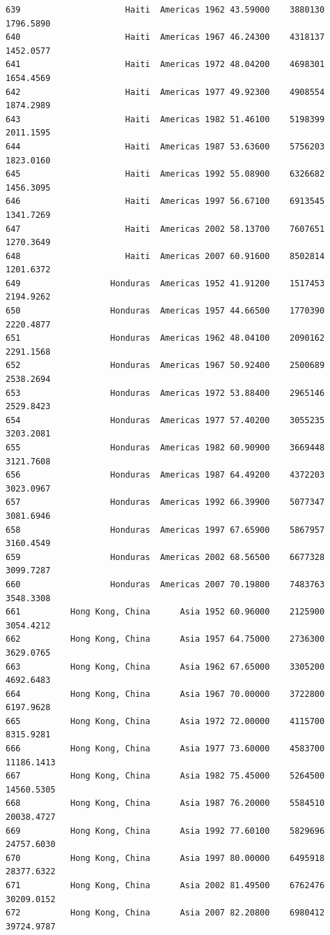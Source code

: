 \documentclass[
  letterpaper,
  DIV=11,
  numbers=noendperiod]{scrreprt}
\begin{document}
\begin{verbatim}
639                     Haiti  Americas 1962 43.59000    3880130   1796.5890
640                     Haiti  Americas 1967 46.24300    4318137   1452.0577
641                     Haiti  Americas 1972 48.04200    4698301   1654.4569
642                     Haiti  Americas 1977 49.92300    4908554   1874.2989
643                     Haiti  Americas 1982 51.46100    5198399   2011.1595
644                     Haiti  Americas 1987 53.63600    5756203   1823.0160
645                     Haiti  Americas 1992 55.08900    6326682   1456.3095
646                     Haiti  Americas 1997 56.67100    6913545   1341.7269
647                     Haiti  Americas 2002 58.13700    7607651   1270.3649
648                     Haiti  Americas 2007 60.91600    8502814   1201.6372
649                  Honduras  Americas 1952 41.91200    1517453   2194.9262
650                  Honduras  Americas 1957 44.66500    1770390   2220.4877
651                  Honduras  Americas 1962 48.04100    2090162   2291.1568
652                  Honduras  Americas 1967 50.92400    2500689   2538.2694
653                  Honduras  Americas 1972 53.88400    2965146   2529.8423
654                  Honduras  Americas 1977 57.40200    3055235   3203.2081
655                  Honduras  Americas 1982 60.90900    3669448   3121.7608
656                  Honduras  Americas 1987 64.49200    4372203   3023.0967
657                  Honduras  Americas 1992 66.39900    5077347   3081.6946
658                  Honduras  Americas 1997 67.65900    5867957   3160.4549
659                  Honduras  Americas 2002 68.56500    6677328   3099.7287
660                  Honduras  Americas 2007 70.19800    7483763   3548.3308
661          Hong Kong, China      Asia 1952 60.96000    2125900   3054.4212
662          Hong Kong, China      Asia 1957 64.75000    2736300   3629.0765
663          Hong Kong, China      Asia 1962 67.65000    3305200   4692.6483
664          Hong Kong, China      Asia 1967 70.00000    3722800   6197.9628
665          Hong Kong, China      Asia 1972 72.00000    4115700   8315.9281
666          Hong Kong, China      Asia 1977 73.60000    4583700  11186.1413
667          Hong Kong, China      Asia 1982 75.45000    5264500  14560.5305
668          Hong Kong, China      Asia 1987 76.20000    5584510  20038.4727
669          Hong Kong, China      Asia 1992 77.60100    5829696  24757.6030
670          Hong Kong, China      Asia 1997 80.00000    6495918  28377.6322
671          Hong Kong, China      Asia 2002 81.49500    6762476  30209.0152
672          Hong Kong, China      Asia 2007 82.20800    6980412  39724.9787

\end{verbatim}
\end{document}
